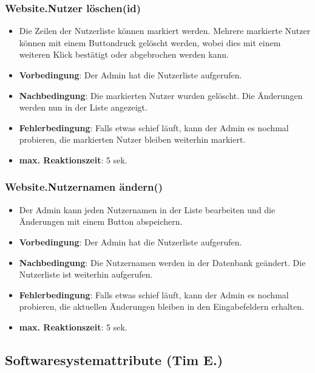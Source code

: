\documentclass[fontsize=12pt,paper=a4,twoside]{scrartcl}
\begin{document}
\subsubsection{Website.Nutzer löschen(id)}
\begin{itemize}
\item Die Zeilen der Nutzerliste können markiert werden. Mehrere markierte Nutzer können mit einem Buttondruck gelöscht werden, wobei dies mit einem weiteren Klick bestätigt oder abgebrochen werden kann.
\item \textbf{Vorbedingung}: Der Admin hat die Nutzerliste aufgerufen.
\item \textbf{Nachbedingung}: Die markierten Nutzer wurden gelöscht. Die Änderungen werden nun in der Liste angezeigt.
\item \textbf{Fehlerbedingung}: Falls etwas schief läuft, kann der Admin es nochmal probieren, die markierten Nutzer bleiben weiterhin markiert.
\item \textbf{max. Reaktionszeit}: 5 sek.
\end{itemize}

\subsubsection{Website.Nutzernamen ändern()}
\begin{itemize}
\item Der Admin kann jeden Nutzernamen in der Liste bearbeiten und die Änderungen mit einem Button abspeichern.
\item \textbf{Vorbedingung}: Der Admin hat die Nutzerliste aufgerufen.
\item \textbf{Nachbedingung}: Die Nutzernamen werden in der Datenbank geändert. Die Nutzerliste ist weiterhin aufgerufen.
\item \textbf{Fehlerbedingung}: Falls etwas schief läuft, kann der Admin es nochmal probieren, die aktuellen Änderungen bleiben in den Eingabefeldern erhalten.
\item \textbf{max. Reaktionszeit}: 5 sek.
\end{itemize}


\subsection{Softwaresystemattribute (Tim E.)}
\label{sec:softwaresystemattribute}
\end{document}
